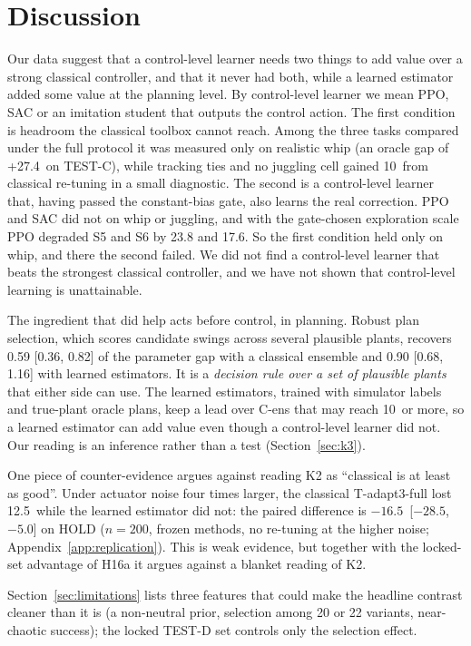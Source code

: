\section{Discussion}
\label{sec:discussion}

Our data suggest that a control-level learner needs two things to add value over a strong classical controller, and that it never had both, while a learned estimator added some value at the planning level. By control-level learner we mean PPO, SAC or an imitation student that outputs the control action. The first condition is headroom the classical toolbox cannot reach. Among the three tasks compared under the full protocol it was measured only on realistic whip (an oracle gap of +27.4\pp\ on TEST-C), while tracking ties and no juggling cell gained 10\pp\ from classical re-tuning in a small diagnostic. The second is a control-level learner that, having passed the constant-bias gate, also learns the real correction. PPO and SAC did not on whip or juggling, and with the gate-chosen exploration scale PPO degraded S5 and S6 by 23.8 and 17.6\pp. So the first condition held only on whip, and there the second failed. We did not find a control-level learner that beats the strongest classical controller, and we have not shown that control-level learning is unattainable.

The ingredient that did help acts before control, in planning. Robust plan selection, which scores candidate swings across several plausible plants, recovers 0.59 [0.36, 0.82] of the parameter gap with a classical ensemble and 0.90 [0.68, 1.16] with learned estimators. It is a \emph{decision rule over a set of plausible plants} that either side can use. The learned estimators, trained with simulator labels and true-plant oracle plans, keep a lead over C-ens that may reach 10\pp\ or more, so a learned estimator can add value even though a control-level learner did not. Our reading is an inference rather than a test (Section~\ref{sec:k3}).

One piece of counter-evidence argues against reading K2 as ``classical is at least as good''. Under actuator noise four times larger, the classical T-adapt3-full lost 12.5\pp\ while the learned estimator did not: the paired difference is $-16.5$\pp\ [$-28.5$, $-5.0$] on HOLD ($n{=}200$, frozen methods, no re-tuning at the higher noise; Appendix~\ref{app:replication}). This is weak evidence, but together with the locked-set advantage of H16a it argues against a blanket reading of K2.

Section~\ref{sec:limitations} lists three features that could make the headline contrast cleaner than it is (a non-neutral prior, selection among 20 or 22 variants, near-chaotic success); the locked TEST-D set controls only the selection effect.

